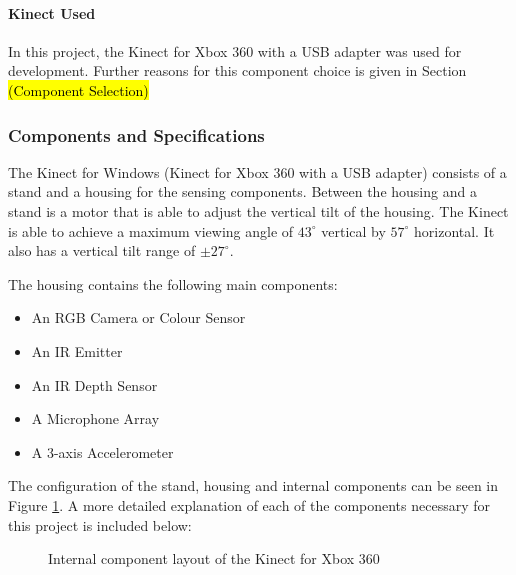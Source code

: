 \paragraph{Kinect Used}
In this project, the Kinect for Xbox 360 with a USB adapter was used for development. Further reasons for this component choice is given in Section \hl{(Component Selection)}

\subsubsection{Components and Specifications} \label{kinectCompSpecs}
The Kinect for Windows (Kinect for Xbox 360 with a USB adapter) consists of a stand and a housing for the sensing components. Between the housing and a stand is a motor that is able to adjust the vertical tilt of the housing. The Kinect is able to achieve a maximum viewing angle of $43^{\circ}$ vertical by $57^{\circ}$ horizontal. It also has a vertical tilt range of $\pm27^{\circ}$. \cite{msdnKinectSpecs2017}

The housing contains the following main components:

\begin{itemize}
	\item An RGB Camera or Colour Sensor
	\item An IR Emitter
	\item An IR Depth Sensor
	\item A Microphone Array
	\item A 3-axis Accelerometer
\end{itemize}

The configuration of the stand, housing and internal components can be seen in Figure \ref{fig:kinectComponents}. A more detailed explanation of each of the components necessary for this project is included below:

\begin{figure}[ht]
	\centering
	{%
		\setlength{\fboxsep}{0pt}%
		\setlength{\fboxrule}{0.5pt}%
		}
	\caption{Internal component layout of the Kinect for Xbox 360 \cite{msdnKinectSpecs2017}}
	\label{fig:kinectComponents}
\end{figure}

